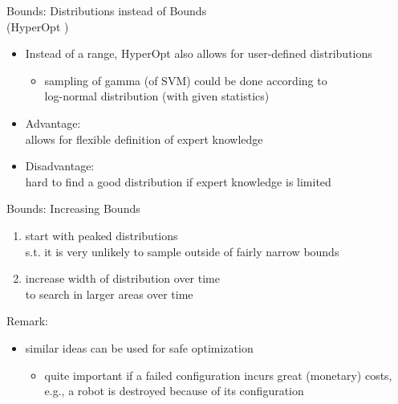 \begin{frame}[c]{Bounds: Distributions instead of Bounds\\ (HyperOpt )}

\begin{itemize}
  \item Instead of a range, HyperOpt also allows for user-defined distributions
  \begin{itemize}
    \item sampling of gamma (of SVM) could be done according to\\ log-normal distribution (with given statistics) 
  \end{itemize}
  \item Advantage:\\ allows for flexible definition of expert knowledge
  \item Disadvantage:\\ hard to find a good distribution if expert knowledge is limited
\end{itemize}

\end{frame}
\begin{frame}[c]{Bounds: Increasing Bounds }

\begin{enumerate}
  \item start with peaked distributions \\ s.t. it is very unlikely to sample outside of fairly narrow bounds
  \item increase width of distribution over time\\ to search in larger areas over time
\end{enumerate}

\bigskip
\pause

Remark:
\begin{itemize}
  \item similar ideas can be used for safe optimization
  \begin{itemize}
    \item quite important if a failed configuration incurs great (monetary) costs, \\
          e.g., a robot is destroyed because of its configuration 
  \end{itemize}
\end{itemize}

\end{frame}
